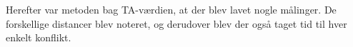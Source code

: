 Herefter var metoden bag TA-værdien, at der blev lavet nogle målinger. De forskellige distancer blev noteret, og derudover blev der også taget tid til hver enkelt konflikt.~\\

